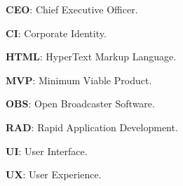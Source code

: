 
\textbf{CEO}: Chief Executive Officer.

\textbf{CI}: Corporate Identity.

\textbf{HTML}: HyperText Markup Language.

\textbf{MVP}: Minimum Viable Product.

\textbf{OBS}: Open Broadcaster Software.

\textbf{RAD}: Rapid Application Development.

\textbf{UI}: User Interface.

\textbf{UX}: User Experience.